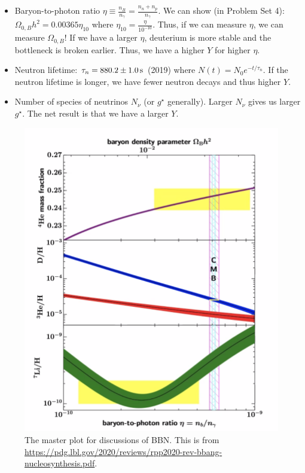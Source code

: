 \documentclass{article}
\newcommand{\unit}[1]{{\,\rm #1}}
\newcommand{\s}{\unit{s}}
\begin{document}
\begin{itemize}
    \item Baryon-to-photon ratio $\eta \equiv \frac{n_B}{n_\gamma} = \frac{n_n + n_p}{n_\gamma}$. We can show (in Problem Set 4): $\Omega_{0,B} h^2 = 0.00365 \eta_{10}$ where $\eta_{10} = \frac{\eta}{10^{-10}}$. Thus, if we can measure $\eta$, we can measure $\Omega_{0,B}$! If we have a larger $\eta$, deuterium is more stable and the bottleneck is broken earlier. Thus, we have a higher $Y$ for higher $\eta$. 
    \item Neutron lifetime: $\tau_n = 880.2 \pm 1.0 \s$ (2019) where $N(t) = N_0 e^{-t/\tau_n}$. If the neutron lifetime is longer, we have fewer neutron decays and thus higher $Y$. 
    \item Number of species of neutrinos $N_\nu$ (or $g^\star$ generally). Larger $N_\nu$ gives us larger $g^\star$. The net result is that we have a larger $Y$.  
\end{itemize}

\begin{figure}
    \centering
    \includegraphics{Screen Shot 2021-03-10 at 11.51.46 AM.png}
    \caption{The master plot for discussions of BBN. This is from \url{https://pdg.lbl.gov/2020/reviews/rpp2020-rev-bbang-nucleosynthesis.pdf}. }
    \label{fig:my_label}
\end{figure}
\end{document}
